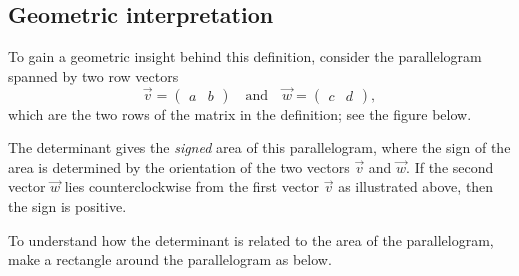 \documentclass{ximera}
\begin{document}

\subsection{Geometric interpretation}
To gain a geometric insight behind this definition, consider the
parallelogram spanned by two row vectors
\[
  \vec{v} =
  \begin{pmatrix}
    a & b
  \end{pmatrix}
  \quad\text{and}\quad
  \vec{w} =
  \begin{pmatrix}
    c & d
  \end{pmatrix},
\]
which are the two rows of the matrix in the definition; see the figure
below.

\begin{image}
\end{image}

The determinant gives the \textit{signed} area of this parallelogram,
where the sign of the area is determined by the orientation of the two
vectors $\vec{v}$ and $\vec{w}$. If the second vector $\vec{w}$ lies
counterclockwise from the first vector $\vec{v}$ as illustrated above,
then the sign is positive.

To understand how the determinant is related to the area of the
parallelogram, make a rectangle around the parallelogram as below.
\end{document}
